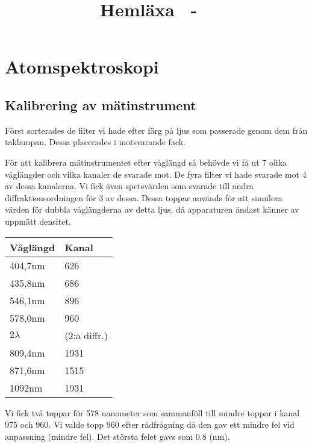\documentclass[a4paper,10pt]{article}
\title{Hemläxa \homeworknumber\ - \course\ \coursename}
\date{\thedate}
\author{\theauthor}
\begin{document}
\maketitle %
	\thispagestyle{empty}
\newpage %
\thispagestyle{empty}
\tableofcontents %
\newpage


\section{Atomspektroskopi}

\subsection{Kalibrering av mätinstrument}

Först sorterades de filter vi hade efter färg på ljus som passerade genom dem från taklampan. Dessa placerades i motsvarande fack.

För att kalibrera mätinstrumentet efter våglängd så behövde vi få ut 7 olika våglängder och vilka kanaler de svarade mot. De fyra filter vi hade svarade mot 4 av dessa kanalerna. Vi fick även spetsvärden som svarade till andra diffraktionsordningen för 3 av dessa. Dessa toppar används för att simulera värden för dubbla våglängderna av detta ljus, då apparaturen ändast känner av uppmätt densitet.

\begin{center}
\begin{tabular}[c]{|l|l|}
	\hline
	Våglängd & Kanal \\
	\hline
	404,7nm & 626 \\
	435,8nm & 686 \\
	546,1nm & 896 \\
	578,0nm & 960 \\
	\hline
	$2\lambda$ & (2:a diffr.) \\
	\hline
	809,4nm & 1931 \\
	871,6nm & 1515 \\
	1092nm & 1931 \\
	\hline
\end {tabular}
\end {center}
\vspace{10pt}

Vi fick två toppar för 578 nanometer som sammanföll till mindre toppar i kanal 975 och 960. Vi valde topp 960 efter rådfrågning då den gav ett mindre fel vid anpassning (mindre fel). Det största felet gavs som 0.8 (nm).
\end{document}
